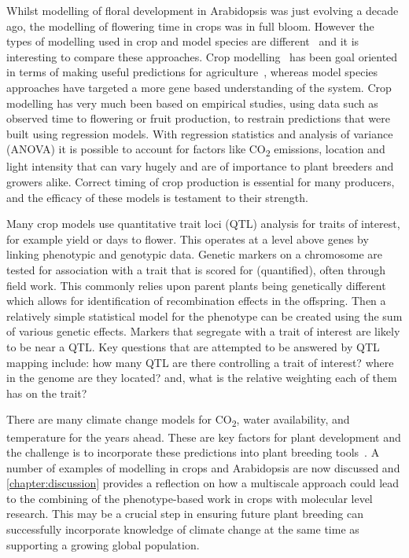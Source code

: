 Whilst modelling of floral development in Arabidopsis was just evolving a decade ago, the modelling of flowering time in crops was in full bloom.
However the types of modelling used in crop and model species are different~\cite{hammer2004} and it is interesting to compare these approaches.
Crop modelling~\cite{thornley1990} has been goal oriented in terms of making useful predictions for agriculture~\cite{yin2010}, whereas model species approaches have targeted a more gene based understanding of the system.
Crop modelling has very much been based on empirical studies, using data such as observed time to flowering or fruit production, to restrain predictions that were built using regression models.
With regression statistics and analysis of variance (ANOVA) it is possible to account for factors like CO\textsubscript{2} emissions, location and light intensity that can vary hugely and are of importance to plant breeders and growers alike.
Correct timing of crop production is essential for many producers, and the efficacy of these models is testament to their strength.

Many crop models use quantitative trait loci (QTL) analysis for traits of interest, for example yield or days to flower.
This operates at a level above genes by linking phenotypic and genotypic data.
Genetic markers on a chromosome are tested for association with a trait that is scored for (quantified), often through field work.
This commonly relies upon parent plants being genetically different which allows for identification of recombination effects in the offspring.
Then a relatively simple statistical model for the phenotype can be created using the sum of various genetic effects.
Markers that segregate with a trait of interest are likely to be near a QTL.
Key questions that are attempted to be answered by QTL mapping include: how many QTL are there controlling a trait of interest? where in the genome are they located? and, what is the relative weighting each of them has on the trait?

There are many climate change models for CO\textsubscript{2}, water availability, and temperature for the years ahead.
These are key factors for plant development and the challenge is to incorporate these predictions into plant breeding tools~\cite{soussana2010}.
A number of examples of modelling in crops and Arabidopsis are now discussed and \autoref{chapter:discussion} provides a reflection on how a multiscale approach could lead to the combining of the phenotype-based work in crops with molecular level research.
This may be a crucial step in ensuring future plant breeding can successfully incorporate knowledge of climate change at the same time as supporting a growing global population.

